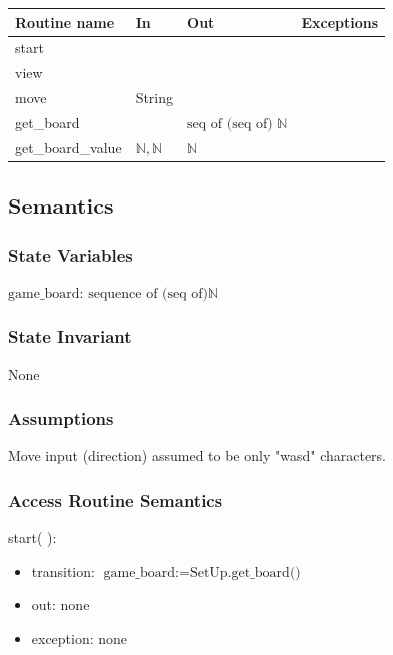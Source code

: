 \documentclass[12pt]{article}
\begin{document}
\begin{tabular}{| l | l | l | p{5cm} |}
  \hline
  \textbf{Routine name} & \textbf{In} & \textbf{Out} & \textbf{Exceptions}\\
  \hline
  start & & & & \\
  \hline
  view & & & \\
  \hline
  move & String & & \\
  \hline
  get\_board & & $\text{seq of (seq of) } \mathbb{N}$ & \\
  \hline
  get\_board\_value & $\mathbb{N}, \mathbb{N}$ & $\mathbb{N}$ & \\
  \hline
  
\end{tabular}

\subsection* {Semantics}

\subsubsection* {State Variables}

$\text{game\_board}$: $\text{sequence of (seq of)} \mathbb{N}$

\subsubsection* {State Invariant}

None

\subsubsection* {Assumptions}

Move input (direction) assumed to be only "wasd" characters. 

\subsubsection* {Access Routine Semantics}

\noindent start( ):
\begin{itemize}
\item transition: $\text{game\_board} := \text{SetUp.get\_board()}$
\item out: none
\item exception: none
\end{itemize}
\end{document}
